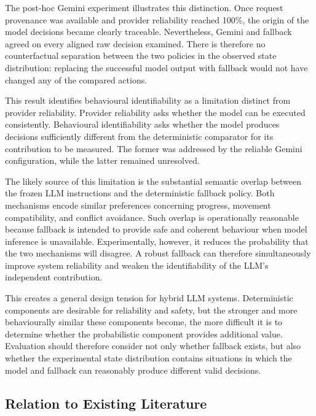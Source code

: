 \documentclass[letterpaper,10pt,conference]{ieeeconf}
\begin{document}
The post-hoc Gemini experiment illustrates this distinction. Once request provenance was available and provider reliability reached 100\%, the origin of the model decisions became clearly traceable. Nevertheless, Gemini and fallback agreed on every aligned raw decision examined. There is therefore no counterfactual separation between the two policies in the observed state distribution: replacing the successful model output with fallback would not have changed any of the compared actions.



This result identifies behavioural identifiability as a limitation distinct from provider reliability. Provider reliability asks whether the model can be executed consistently. Behavioural identifiability asks whether the model produces decisions sufficiently different from the deterministic comparator for its contribution to be measured. The former was addressed by the reliable Gemini configuration, while the latter remained unresolved.



The likely source of this limitation is the substantial semantic overlap between the frozen LLM instructions and the deterministic fallback policy. Both mechanisms encode similar preferences concerning progress, movement compatibility, and conflict avoidance. Such overlap is operationally reasonable because fallback is intended to provide safe and coherent behaviour when model inference is unavailable. Experimentally, however, it reduces the probability that the two mechanisms will disagree. A robust fallback can therefore simultaneously improve system reliability and weaken the identifiability of the LLM's independent contribution.



This creates a general design tension for hybrid LLM systems. Deterministic components are desirable for reliability and safety, but the stronger and more behaviourally similar these components become, the more difficult it is to determine whether the probabilistic component provides additional value. Evaluation should therefore consider not only whether fallback exists, but also whether the experimental state distribution contains situations in which the model and fallback can reasonably produce different valid decisions.



\subsection{Relation to Existing Literature}
\end{document}
